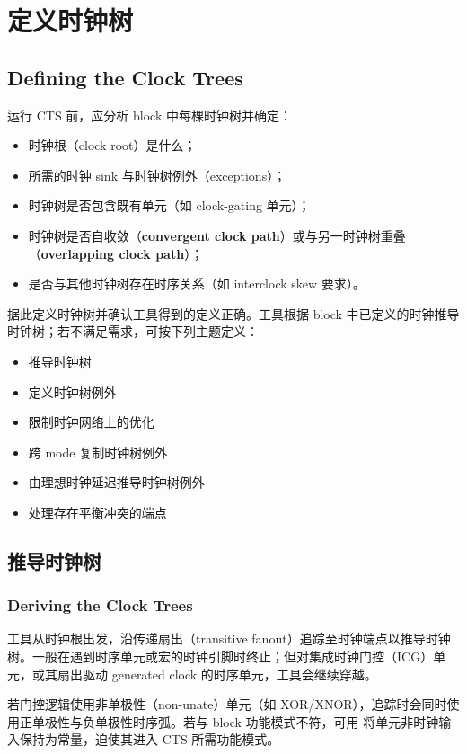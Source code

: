 \section{定义时钟树}
\subsection*{Defining the Clock Trees}

运行 CTS 前，应分析 block 中每棵时钟树并确定：
\begin{itemize}
  \item 时钟根（clock root）是什么；
  \item 所需的时钟 sink 与时钟树例外（exceptions）；
  \item 时钟树是否包含既有单元（如 clock-gating 单元）；
  \item 时钟树是否自收敛（\textbf{convergent clock path}）或与另一时钟树重叠（\textbf{overlapping clock path}）；
  \item 是否与其他时钟树存在时序关系（如 interclock skew 要求）。
\end{itemize}

据此定义时钟树并确认工具得到的定义正确。工具根据 block 中已定义的时钟推导时钟树；若不满足需求，可按下列主题定义：
\begin{itemize}
  \item 推导时钟树
  \item 定义时钟树例外
  \item 限制时钟网络上的优化
  \item 跨 mode 复制时钟树例外
  \item 由理想时钟延迟推导时钟树例外
  \item 处理存在平衡冲突的端点
\end{itemize}

\subsection{推导时钟树}
\subsubsection*{Deriving the Clock Trees}

工具从时钟根出发，沿传递扇出（transitive fanout）追踪至时钟端点以推导时钟树。一般在遇到时序单元或宏的时钟引脚时终止；但对集成时钟门控（ICG）单元，或其扇出驱动 generated clock 的时序单元，工具会继续穿越。

若门控逻辑使用非单极性（non-unate）单元（如 XOR/XNOR），追踪时会同时使用正单极性与负单极性时序弧。若与 block 功能模式不符，可用  将单元非时钟输入保持为常量，迫使其进入 CTS 所需功能模式。

